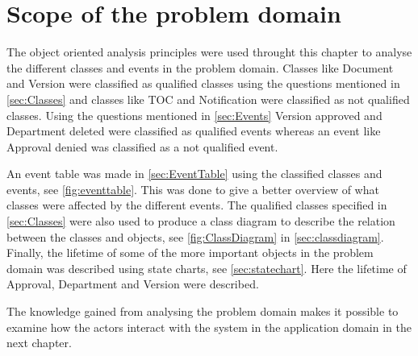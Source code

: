 \section{Scope of the problem domain}

The object oriented analysis principles were used throught this chapter to analyse the different classes and events in the problem domain.
Classes like Document and Version were classified as qualified classes using the questions mentioned in \cref{sec:Classes} and classes like TOC and Notification were classified as not qualified classes.
Using the questions mentioned in \cref{sec:Events} Version approved and Department deleted were classified as qualified events whereas an event like Approval denied was classified as a not qualified event.

An event table was made in \cref{sec:EventTable} using the classified classes and events, see \cref{fig:eventtable}.
This was done to give a better overview of what classes were affected by the different events.
The qualified classes specified in \cref{sec:Classes} were also used to produce a class diagram to describe the relation between the classes and objects, see \cref{fig:ClassDiagram} in \cref{sec:classdiagram}. 
Finally, the lifetime of some of the more important objects in the problem domain was described using state charts, see \cref{sec:statechart}.
Here the lifetime of Approval, Department and Version were described.

The knowledge gained from analysing the problem domain makes it possible to examine how the actors interact with the system in the application domain in the next chapter.

